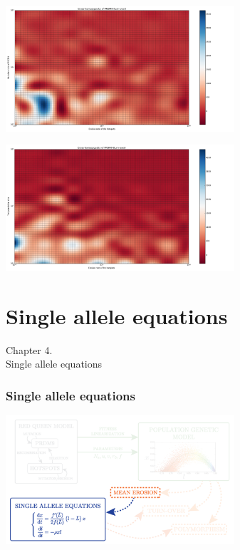 \documentclass[10pt]{beamer}
\begin{document}
\begin{frame}
	\begin{center}
       \includegraphics[width=8.5cm]{Images/cross-homozygosity-mutation-erosion.png}
	\end{center}
\end{frame}


\begin{frame}
	\begin{center}
       \includegraphics[width=8.5cm]{Images/cross-homozygosity-population-erosion.png}
	\end{center}
\end{frame}



\section{Single allele equations}

\begin{frame}
	\begin{center}
	\huge
	Chapter 4. \\
       Single allele equations
	\end{center}
\end{frame}


\begin{frame}
\frametitle{Single allele equations}
	\begin{center}
       \includegraphics[width=8.5cm]{Images/overline-4.png}
	\end{center}
\end{frame}
\end{document}
